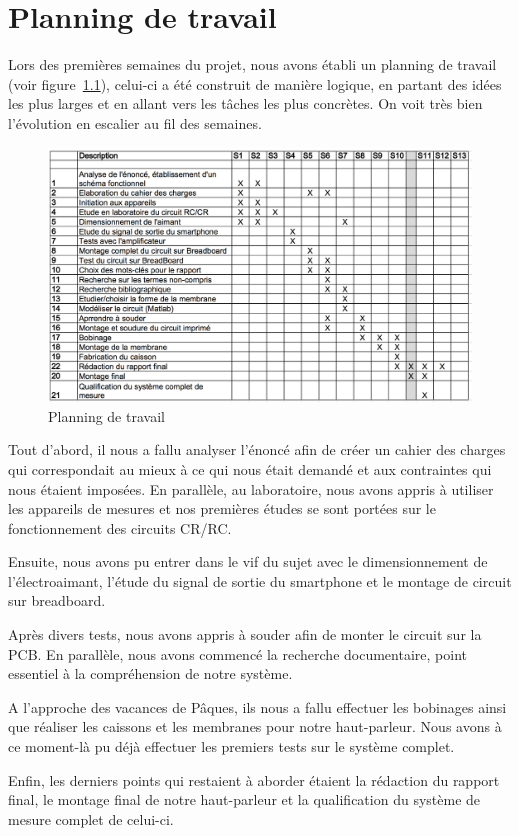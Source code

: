 \chapter{Planning de travail}
\label{annexe:planning}

Lors des premières semaines du projet, nous avons établi un planning de travail (voir figure~\ref{fig:plan}), celui-ci a été construit de manière logique, en partant des idées les plus larges et en allant vers les tâches les plus concrètes. On voit très bien l'évolution en escalier au fil des semaines.

\begin{figure}	
\begin{center}
\includegraphics[width=\textwidth]{img/planning} 
\end{center}
\caption{Planning de travail}		
\label{fig:plan}		
\end{figure}

Tout d'abord, il nous a fallu analyser l'énoncé afin de créer un cahier des charges qui correspondait au mieux à ce qui nous était demandé et aux contraintes qui nous étaient imposées. 
En parallèle, au laboratoire, nous avons appris à utiliser les appareils de mesures et nos premières études se sont portées sur le fonctionnement des circuits CR/RC.

Ensuite, nous avons pu entrer dans le vif du sujet avec le dimensionnement de l'électroaimant, l'étude du signal de sortie du smartphone et le montage de circuit sur breadboard.

Après divers tests, nous avons appris à souder afin de monter le circuit sur la PCB. En parallèle, nous avons commencé la recherche documentaire, point essentiel à la compréhension de notre système.

A l'approche des vacances de Pâques, ils nous a fallu effectuer les bobinages ainsi que réaliser les caissons et les membranes pour notre haut-parleur. Nous avons à ce moment-là pu déjà effectuer les premiers tests sur le système complet.

Enfin, les derniers points qui restaient à aborder étaient la rédaction du rapport final, le montage final de notre haut-parleur et la qualification du système de mesure complet de celui-ci.

